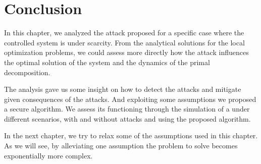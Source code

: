 \documentclass[../main.tex]{subfiles}
\begin{document}
\section{Conclusion}\label{sec:conclusion_eq}
In this chapter, we analyzed the \fdi{} attack proposed for a specific case where the controlled system is under scarcity.
From the analytical solutions for the local optimization problems, we could assess more directly how the attack influences the optimal solution of the system and the dynamics of the primal decomposition.

The analysis gave us some insight on how to detect the attacks and mitigate given consequences of the attacks.
And exploiting some assumptions we proposed a secure \dmpc{} algorithm.
We assess its functioning through the simulation of a \dhn{} under different scenarios, with and without attacks and using the proposed algorithm.

In the next chapter, we try to relax some of the assumptions used in this chapter.
As we will see, by alleviating one assumption the problem to solve becomes exponentially more complex.
\end{document}
